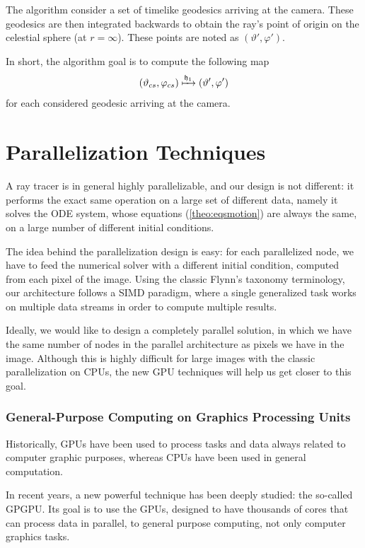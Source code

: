 The algorithm consider a set of timelike geodesics arriving at the camera. These geodesics are then integrated backwards to obtain the ray's point of origin on the celestial sphere (at $r = \infty$). These points are noted as $(\vartheta', \varphi')$.

In short, the algorithm goal is to compute the following map
\begin{equation}
\label{eq:initmap}
(\vartheta_{cs}, \varphi_{cs}) \xmapsto{\mathfrak{h}_1} (\vartheta', \varphi')
\end{equation}
for each considered geodesic arriving at the camera.

\section{Parallelization Techniques}
\label{sec:parallel}

A ray tracer is in general highly parallelizable, and our design is not different: it performs the exact same operation on a large set of different data, namely it solves the \ac{ODE} system, whose equations (\autoref{theo:eqsmotion}) are always the same, on a large number of different initial conditions.

The idea behind the parallelization design is easy: for each parallelized node, we have to feed the numerical solver with a different initial condition, computed from each pixel of the image. Using the classic Flynn's taxonomy \cite{flynn72} terminology, our architecture follows a \ac{SIMD} paradigm, where a single generalized task works on multiple data streams in order to compute multiple results.

Ideally, we would like to design a completely parallel solution, in which we have the same number of nodes in the parallel architecture as pixels we have in the image. Although this is highly difficult for large images with the classic parallelization on \acp{CPU}, the new \ac{GPU} techniques will help us get closer to this goal.

\subsubsection*{General-Purpose Computing on Graphics Processing Units}

Historically, \acp{GPU} have been used to process tasks and data always related to computer graphic purposes, whereas \acp{CPU} have been used in general computation.

In recent years, a new powerful technique has been deeply studied: the so-called \ac{GPGPU}. Its goal is to use the \acp{GPU}, designed to have thousands of cores that can process data in parallel, to general purpose computing, not only computer graphics tasks.

